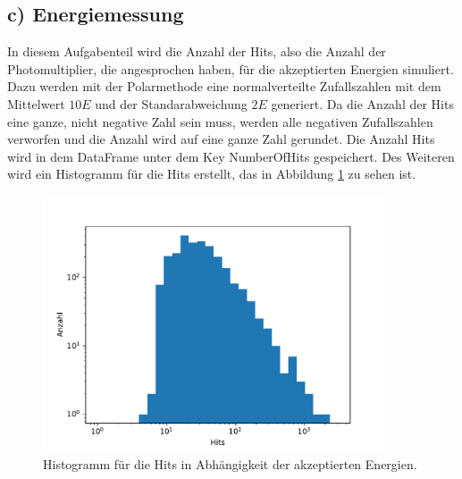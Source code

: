 \documentclass[a4paper, 11pt]{article}
\begin{document}
\FloatBarrier
\subsection*{c) Energiemessung}
In diesem Aufgabenteil wird die Anzahl der Hits, also die Anzahl der Photomultiplier,
die angesprochen haben, für die akzeptierten Energien simuliert.
Dazu werden mit der Polarmethode eine normalverteilte Zufallszahlen mit dem
Mittelwert $10 E$ und der Standarabweichung $2E$ generiert.
Da die Anzahl der
Hits eine ganze, nicht negative Zahl sein muss, werden alle negativen Zufallszahlen
verworfen und die Anzahl wird auf eine ganze Zahl gerundet. Die Anzahl Hits wird
in dem DataFrame unter dem Key NumberOfHits gespeichert. Des Weiteren wird ein
Histogramm für die Hits erstellt, das in Abbildung \ref{fig:hits} zu sehen ist.
\begin{figure}
  \centering
  \includegraphics[width=0.9\textwidth]{../Hits.pdf}
  \caption{Histogramm für die Hits in Abhängigkeit der akzeptierten Energien.}
  \label{fig:hits}
\end{figure}

\FloatBarrier
\end{document}
